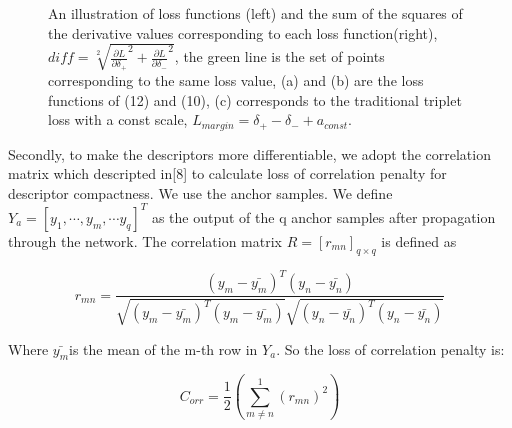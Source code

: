 \documentclass[letterpaper, 10 pt, conference]{ieeeconf}  %
\begin{document}
\begin{figure}[htbp]
\centering
{}%
\\
%
\\
%
\centering
\caption{An illustration of loss functions (left)  and the sum of the squares of the derivative values corresponding to each loss function(right), $diff = \sqrt[2]{\frac{\partial L}{\partial \delta _{+}}^{2} + \frac{\partial L}{\partial \delta _{-}}^{2}}$, the green line is the set of points corresponding to the same loss value, (a) and (b) are the loss functions of (12) and (10), (c) corresponds to the traditional triplet loss with a const scale, $L_{margin} = \delta _{+} - \delta _{-} + a_{const}.$ } 
\end{figure}
Secondly, to make the descriptors more differentiable, we adopt the correlation matrix which descripted in[8] to calculate loss of correlation penalty for descriptor compactness. We use the anchor samples. We define $Y_{a} = \left [ y_{1},\cdots, y_{m},\cdots y_{q}\right ]^{T}$ as the output of the q anchor samples after propagation through the network. The correlation matrix  $R = \left [ r_{mn} \right ]_{q\times q}$ is defined as

\begin{small} 
\begin{equation} 
r_{mn} = \frac{(y_{m}-\bar{y_{m}})^{T}(y_{n}-\bar{y_{n}})}{\sqrt{(y_{m}-\bar{y_{m}})^{T}(y_{m}-\bar{y_{m}})}\sqrt{(y_{n}-\bar{y_{n}})^{T}(y_{n}-\bar{y_{n}})}} \tag{12}
\end{equation} 
\end{small}

Where $\bar{y_{m}}$is the mean of the m-th row in $Y_{a}$. So the loss of correlation penalty is:

\begin{small} 
\begin{equation} 
C_{orr} = \frac{1}{2}\left ( \sum_{m\neq n}^{1} (r_{mn})^{2} \right ) \tag{13}
\end{equation} 
\end{small}
\end{document}
